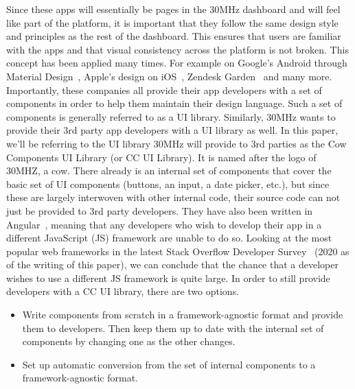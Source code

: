 Since these apps will essentially be pages in the 30MHz dashboard and will feel like part of the platform, it is important that they follow the same design style and principles as the rest of the dashboard. This ensures that users are familiar with the apps and that visual consistency across the platform is not broken. This concept has been applied many times. For example on Google's Android through Material Design~, Apple's design on iOS~, Zendesk Garden~ and many more. Importantly, these companies all provide their app developers with a set of components in order to help them maintain their design language. Such a set of components is generally referred to as a UI library. Similarly, 30MHz wants to provide their 3rd party app developers with a UI library as well. In this paper, we'll be referring to the UI library 30MHz will provide to 3rd parties as the Cow Components UI Library (or CC UI Library). It is named after the logo of 30MHZ, a cow. There already is an internal set of components that cover the basic set of UI components (buttons, an input, a date picker, etc.), but since these are largely interwoven with other internal code, their source code can not just be provided to 3rd party developers. They have also been written in Angular~, meaning that any developers who wish to develop their app in a different JavaScript (JS) framework are unable to do so. Looking at the most popular web frameworks in the latest Stack Overflow Developer Survey~ (2020 as of the writing of this paper), we can conclude that the chance that a developer wishes to use a different JS framework is quite large. In order to still provide developers with a CC UI library, there are two options.

\begin{itemize}
	\item Write components from scratch in a framework-agnostic format and provide them to developers. Then keep them up to date with the internal set of components by changing one as the other changes.
	\item Set up automatic conversion from the set of internal components to a framework-agnostic format.
\end{itemize}

